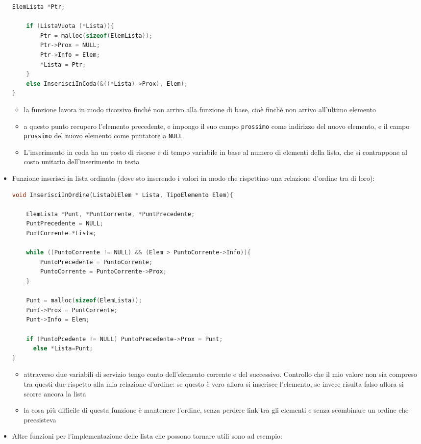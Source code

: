 \documentclass[
  paper=a4,
  oneside  ,captions=tableheading
]{scrbook}
\newcommand{\passthrough}[1]{#1}
\providecommand{\tightlist}{%
  \setlength{\itemsep}{0pt}\setlength{\parskip}{0pt}}
\begin{document}
\begin{itemize}
\begin{lstlisting}[language=C]
    ElemLista *Ptr;

    if (ListaVuota (*Lista)){
        Ptr = malloc(sizeof(ElemLista));
        Ptr->Prox = NULL;
        Ptr->Info = Elem;
        *Lista = Ptr;
    }
    else InserisciInCoda(&((*Lista)->Prox), Elem);
}
\end{lstlisting}

  \begin{itemize}
  \tightlist
  \item
    la funzione lavora in modo ricorsivo finché non arrivo alla funzione
    di base, cioè finché non arrivo all'ultimo elemento
  \item
    a questo punto recupero l'elemento precedente, e impongo il suo
    campo \passthrough{\lstinline!prossimo!} come indirizzo del nuovo
    elemento, e il campo \passthrough{\lstinline!prossimo!} del nuovo
    elemento come puntatore a \passthrough{\lstinline!NULL!}
  \item
    L'inserimento in coda ha un costo di risorse e di tempo variabile in
    base al numero di elementi della lista, che si contrappone al costo
    unitario dell'inserimento in testa
  \end{itemize}
\item
  Funzione inserisci in lista ordinata (dove sto inserendo i valori in
  modo che rispettino una relazione d'ordine tra di loro):

\begin{lstlisting}[language=C]
void InserisciInOrdine(ListaDiElem * Lista, TipoElemento Elem){

    ElemLista *Punt, *PuntCorrente, *PuntPrecedente;
    PuntPrecedente = NULL;
    PuntCorrente=*Lista;

    while ((PuntoCorrente != NULL) && (Elem > PuntoCorrente->Info)){
        PuntoPrecedente = PuntoCorrente;
        PuntoCorrente = PuntoCorrente->Prox;
    }

    Punt = malloc(sizeof(ElemLista));
    Punt->Prox = PuntCorrente;
    Punt->Info = Elem;

    if (PuntoPcedente != NULL) PuntoPrecedente->Prox = Punt;
      else *Lista=Punt;
}
\end{lstlisting}

  \begin{itemize}
  \tightlist
  \item
    attraverso due variabili di servizio tengo conto dell'elemento
    corrente e del successivo. Controllo che il mio valore non sia
    compreso tra questi due rispetto alla mia relazione d'ordine: se
    questo è vero allora si inserisce l'elemento, se invece risulta
    falso allora si scorre ancora la lista
  \item
    la cosa più difficile di questa funzione è mantenere l'ordine, senza
    perdere link tra gli elementi e senza scombinare un ordine che
    preesisteva
  \end{itemize}
\item
  Altre funzioni per l'implementazione delle lista che possono tornare
  utili sono ad esempio:


\end{itemize}
\end{document}
